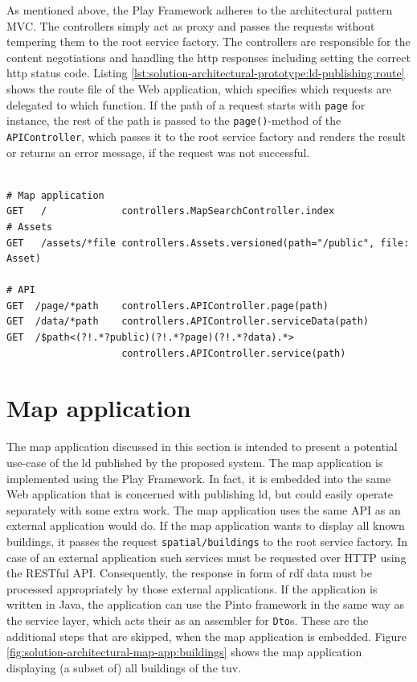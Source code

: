 \documentclass[draft,final]{vutinfth} %
\begin{document}
As mentioned above, the Play Framework adheres to the architectural pattern MVC. The controllers simply act as proxy and passes the requests without tempering them to the root service factory. The controllers are responsible for the content negotiations and handling the \gls{http} responses including setting the correct \gls{http} status code. Listing \ref{lst:solution-architectural-prototype:ld-publishing:route} shows the route file of the Web application, which specifies which requests are delegated to which function. If the path of a request starts with \texttt{page} for instance, the rest of the path is passed to the \texttt{page()}-method of the \texttt{APIController}, which  passes it to the root service factory and renders the result or returns an error message, if the request was not successful.

\begin{lstlisting}[frame=single, basicstyle=\tiny, caption=Route file of Play Web application, label={lst:solution-architectural-prototype:ld-publishing:route}]

# Map application
GET   /             controllers.MapSearchController.index
# Assets
GET   /assets/*file controllers.Assets.versioned(path="/public", file: Asset)

# API
GET  /page/*path    controllers.APIController.page(path)
GET  /data/*path    controllers.APIController.serviceData(path)
GET  /$path<(?!.*?public)(?!.*?page)(?!.*?data).*>
                    controllers.APIController.service(path)
\end{lstlisting}

\section{Map application}
\label{solution-map-application}
The map application discussed in this section is intended to present a potential use-case of the \gls{ld} published by the proposed system. The map application is implemented using the Play Framework. In fact, it is embedded into the same Web application that is concerned with publishing \gls{ld}, but could easily operate separately with some extra work. The map application uses the same API as an external application would do. If the map application wants to display all known buildings, it passes the request \texttt{spatial/buildings} to the root service factory. In case of an external application such services must be requested over HTTP using the RESTful API. Consequently, the response in form of \gls{rdf} data must be processed appropriately by those external applications. If the application is written in Java, the application can use the Pinto framework in the same way as the service layer, which acts their as an assembler for \texttt{Dto}s. These are the additional steps that are skipped, when the map application is embedded. Figure \ref{fig:solution-architectural-map-app:buildings} shows the map application displaying (a subset of) all buildings of the \gls{tuv}.
\end{document}
